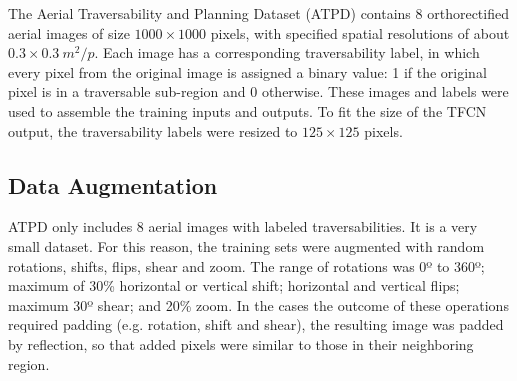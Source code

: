 \documentclass[conference]{IEEEtran}
\begin{document}
The Aerial Traversability and Planning Dataset (ATPD) \cite{borges:2019} contains 8 orthorectified aerial images of size $1000 \times 1000$ pixels, with specified spatial resolutions of about $0.3 \times 0.3 \ m^2/p$.
Each image has a corresponding traversability label, in which every pixel from the original image is assigned a binary value: 1 if the original pixel is in a traversable sub-region and 0 otherwise.
These images and labels were used to assemble the training inputs and outputs.
To fit the size of the TFCN output, the traversability labels were resized to $125 \times 125$ pixels.



\subsection{Data Augmentation}

ATPD only includes 8 aerial images with labeled traversabilities.
It is a very small dataset.
For this reason, the training sets were augmented with random rotations, shifts, flips, shear and zoom.
The range of rotations was 0º to 360º; maximum of 30\% horizontal or vertical shift; horizontal and vertical flips; maximum 30º shear; and 20\% zoom.
In the cases the outcome of these operations required padding (e.g. rotation, shift and shear), the resulting image was padded by reflection, so that added pixels were similar to those in their neighboring region.
\end{document}
